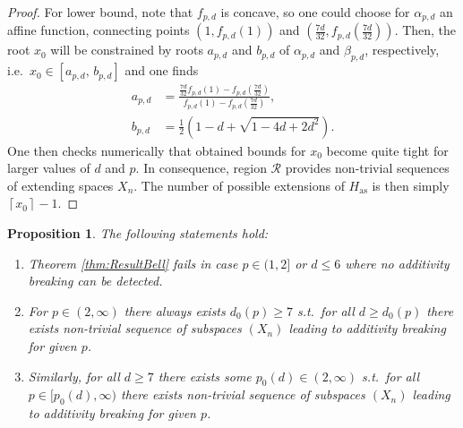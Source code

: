 \documentclass[reqno]{amsart}
\theoremstyle{plain}
\newtheorem{proposition}[theorem]{Proposition}
\theoremstyle{note}
\newcommand{\ceil}[1]{\left\lceil #1 \right\rceil}
\newcommand{\aspace}{H_{\mathrm{as}}}
\begin{document}
\begin{proof}
For lower bound, note that $f_{p,d}$ is concave, so one could choose for $\alpha_{p,d}$ an affine function, connecting points $(1, f_{p,d}(1))$ and $(\frac{7d}{32}, f_{p,d}(\frac{7d}{32}))$. Then, the root $x_0$ will be constrained by roots $a_{p,d}$ and $b_{p,d}$ of $\alpha_{p,d}$ and $\beta_{p,d}$, respectively, i.e.~$x_0 \in [a_{p,d} ,\, b_{p,d}]$ and one finds
\begin{align}\label{eq:BoundsAB}
    a_{p,d} &= \frac{\frac{7d}{32}f_{p,d}(1)-f_{p,d}(\frac{7d}{32})}{f_{p,d}(1)-f_{p,d}(\frac{7d}{32})},\\
    b_{p,d} &= \frac{1}{2} \left( 1 - d + \sqrt{1-4d+2d^2} \right).\nonumber
\end{align}
One then checks numerically that obtained bounds for $x_0$ become quite tight for larger values of $d$ and $p$. In consequence, region $\mathcal{R}$ provides non-trivial sequences of extending spaces $X_n$. The number of possible extensions of $\aspace$ is then simply $\ceil{x_0}-1$.
\end{proof}

\begin{proposition}
\label{prop:RegionRBell}
The following statements hold:
\begin{enumerate}
    \item \label{RegRBellitem2} Theorem \ref{thm:ResultBell} fails in case $p\in(1,2]$ or $d\leqslant 6$ where no additivity breaking can be detected.
    \item \label{RegRBellitem3} For $p \in (2,\infty)$ there always exists $d_0 (p) \geqslant 7$ s.t.~for all $d \geqslant d_0 (p)$ there exists non-trivial sequence of subspaces $(X_n)$ leading to additivity breaking for given $p$.
    \item \label{RegRBellitem4} Similarly, for all $d \geqslant 7$ there exists some $p_0 (d) \in (2,\infty)$ s.t.~for all $p \in [p_0 (d),\infty)$ there exists non-trivial sequence of subspaces $(X_n)$ leading to additivity breaking for given $p$.
\end{enumerate}
\end{proposition}
\end{document}
